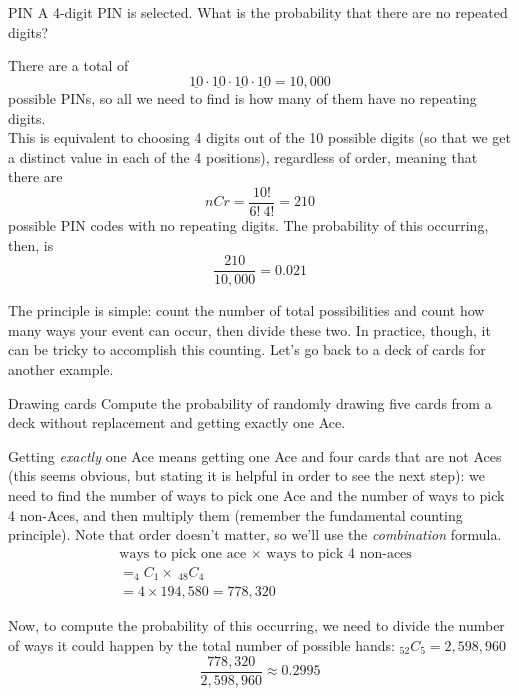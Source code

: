 \begin{example}[https://www.youtube.com/watch?v=D_HPDTJlKNY&list=PLfmpjsIzhzts14-9s5QixRje97EI2oeMF&index=37]{PIN}
A 4-digit PIN is selected. What is the probability that there are no repeated digits?

\sol
There are a total of \[\underline{10} \cdot 
\underline{10} \cdot \underline{10} \cdot \underline{10} = 10,000\] possible PINs, so all we need to find is how many of them have no repeating digits.\\

This is equivalent to choosing 4 digits out of the 10 possible digits (so that we get a distinct value in each of the 4 positions), regardless of order, meaning that there are \[nCr = \dfrac{10!}{6! \ 4!} = 210\] possible PIN codes with no repeating digits.  The probability of this occurring, then, is \[\boxed{\dfrac{210}{10,000} = 0.021}\]
\end{example}

The principle is simple: count the number of total possibilities and count how many ways your event can occur, then divide these two.  In practice, though, it can be tricky to accomplish this counting.  Let's go back to a deck of cards for another example.
\pagebreak

\begin{example}[https://www.youtube.com/watch?v=QXyNszl3_h0&list=PLfmpjsIzhzts14-9s5QixRje97EI2oeMF&index=38]{Drawing cards}
Compute the probability of randomly drawing five cards from a deck without replacement and getting exactly one Ace.

\sol
Getting \textit{exactly} one Ace means getting one Ace and four cards that are not Aces (this seems obvious, but stating it is helpful in order to see the next step): we need to find the number of ways to pick one Ace and the number of ways to pick 4 non-Aces, and then multiply them (remember the fundamental counting principle).  Note that order doesn't matter, so we'll use the \textit{combination} formula.
\begin{align*}
&\textrm{ways to pick one ace } \times \textrm{ ways to pick 4 non-aces}\\
&= _4C_1 \times \ _{48}C_4\\
&= 4 \times 194,580 = 778,320
\end{align*}

Now, to compute the probability of this occurring, we need to divide the number of ways it could happen by the total number of possible hands: $_{52}C_5 = 2,598,960$
\[\boxed{\dfrac{778,320}{2,598,960} \approx 0.2995}\]
\end{example}

